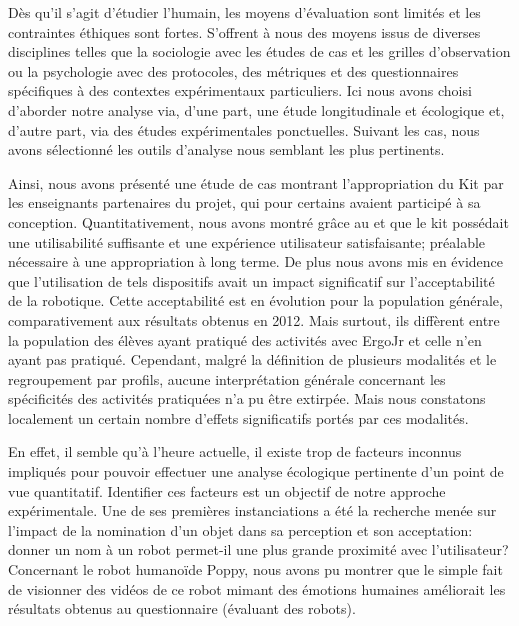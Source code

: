\begin{concluPart}
Dès qu'il s'agit d'étudier l'humain, les moyens d'évaluation sont limités et les contraintes éthiques sont fortes.
S'offrent à nous des moyens issus de diverses disciplines telles que la sociologie avec les études de cas et les grilles d'observation ou la psychologie avec des protocoles, des métriques et des questionnaires spécifiques à des contextes expérimentaux particuliers. Ici nous avons choisi d'aborder notre analyse via, d'une part, une étude longitudinale et écologique et, d'autre part, via des études expérimentales ponctuelles. Suivant les cas, nous avons sélectionné les outils d'analyse nous semblant les plus pertinents.\par%
Ainsi, nous avons présenté une étude de cas montrant l'appropriation du Kit
par les enseignants partenaires du projet, qui pour certains avaient participé à sa conception. Quantitativement, nous avons montré grâce au  et  que le kit possédait une utilisabilité suffisante et une expérience utilisateur satisfaisante; préalable nécessaire à une appropriation à long terme.
De plus nous avons mis en évidence que l'utilisation de tels dispositifs avait un impact significatif sur l'acceptabilité de la robotique. Cette acceptabilité  est en évolution pour la population générale, comparativement aux résultats obtenus en 2012. Mais surtout, ils diffèrent entre la population des élèves ayant pratiqué des activités avec ErgoJr et celle n'en ayant pas pratiqué. Cependant, malgré la définition de plusieurs modalités et le regroupement par profils, aucune interprétation générale concernant les spécificités des activités pratiquées n'a pu être extirpée. Mais nous constatons localement un certain nombre d'effets significatifs portés par ces modalités.\par%
En effet, il semble qu'à l'heure actuelle, il existe trop de facteurs inconnus impliqués pour pouvoir effectuer une analyse écologique pertinente d'un point de vue quantitatif.
Identifier ces facteurs est un objectif de notre approche expérimentale. Une de ses premières instanciations a été la recherche menée sur l'impact de la nomination d'un objet dans sa perception et son acceptation: donner un nom à un robot permet-il une plus grande proximité avec l'utilisateur?
Concernant le robot humanoïde Poppy, nous avons pu montrer que le simple fait de visionner des vidéos de ce robot mimant des émotions humaines améliorait les résultats obtenus au questionnaire  (évaluant  des robots).

\end{concluPart}
